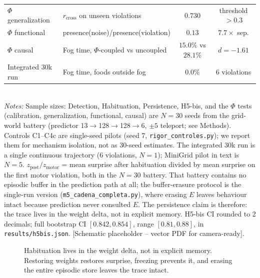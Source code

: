 \documentclass[11pt,a4paper]{article}
\begin{document}
\begin{table}[h]
{\begin{tabular}{@{}llcc@{}}
$\Phi$ generalization & $r_{\mathrm{cross}}$ on unseen violations & $0.730$ & threshold $>0.3$ \\
$\Phi$ functional & presence(noise)/presence(violation) & $0.13$ & $7.7\times$ sep. \\
$\Phi$ causal & Fog time, $\Phi$-coupled vs uncoupled & $15.0\%$ vs $28.1\%$ & $d=-1.61$ \\
Integrated 30k run & Fog time, foods outside fog & $0.0\%$ & 6 violations \\
\bottomrule
\end{tabular}}
\\[0.6ex]
{\small \textit{Notes:} Sample sizes: Detection, Habituation, Persistence, H5-bis, and the $\Phi$ tests (calibration, generalization, functional, causal) are $N=30$ seeds from the grid-world battery (predictor 13$\rightarrow$128$\rightarrow$128$\rightarrow$6, $\pm5$ teleport; see Methods). Controls C1--C4c are single-seed pilots (seed 7, \texttt{rigor\_controles.py}); we report them for mechanism isolation, not as 30-seed estimates. The integrated 30k run is a single continuous trajectory (6 violations, $N=1$); MiniGrid pilot in text is $N=5$. $z_{\mathrm{post}}/z_{\mathrm{motor}}$ = mean surprise after habituation divided by mean surprise on the first motor violation, both in the $N=30$ battery. That battery contains no episodic buffer in the prediction path at all; the buffer-erasure protocol is the single-run version (\texttt{m5\_cadena\_completa.py}), where erasing $E$ leaves behaviour intact because prediction never consulted $E$. The persistence claim is therefore: the trace lives in the weight delta, not in explicit memory. H5-bis CI rounded to 2 decimals; full bootstrap CI $[0.842,0.854]$, range $[0.81,0.88]$, in \texttt{results/h5bis.json}. [Schematic placeholder -- vector PDF for camera-ready].}
\end{table}

\begin{figure}[h]
\centering
{}
\caption{Habituation lives in the weight delta, not in explicit memory. Restoring weights restores surprise, freezing prevents it, and erasing the entire episodic store leaves the trace intact.}
\label{fig:hab}
\end{figure}
\end{document}
